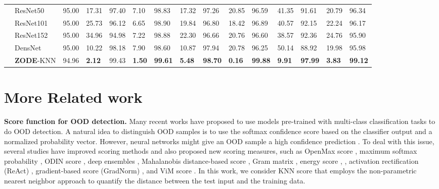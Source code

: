 \documentclass{article} \usepackage{iclr2023_conference,times}
\begin{document}
\begin{table}[t]
\begin{center}
{\begin{tabular}{lllllllllllllll}
& ResNet50 & 95.00 &  17.31 & 97.40 & 7.10 & 98.83 & 17.32 & 97.26 & 20.85 & 96.59 & 41.35 & 91.61 & 20.79 & 96.34\\
& ResNet101 & 95.00 & 25.73 & 96.12 & 6.65 & 98.90 & 19.84 & 96.80 & 18.42 & 96.89 &  40.57 & 92.15 & 22.24 & 96.17\\
& ResNet152 & 95.00 & 34.96 & 94.98 & 7.22 & 98.88 & 22.30 & 96.66 & 20.76 & 96.60 & 38.57 & 92.36 & 24.76 & 95.90 \\
& DensNet & 95.00 & 10.22 & 98.18 & 7.90 & 98.60 & 10.87 & 97.94 &  20.78 & 96.25 & 50.14 & 88.92 & 19.98 & 95.98\\
& {\bf ZODE}-KNN & 94.96 & {\bf 2.12} &  99.43 & {\bf 1.50} & {\bf 99.61} & {\bf 5.48} & {\bf 98.70} & {\bf 0.16} & {\bf 99.88} & {\bf 9.91} & {\bf 97.99} & {\bf 3.83} & {\bf 99.12} \\
\hline\hline
\end{tabular}}
\end{center}
\end{table}






\section{More Related work}\label{Related work}

\textbf{Score function for OOD detection.} Many recent works have proposed to use models pre-trained with multi-class classification tasks to do OOD detection.
A natural idea to distinguish OOD samples is to use the softmax confidence score based on the classifier output and a normalized probability vector.
However, neural networks might give an OOD sample a high confidence prediction \citep{guo2017calibration,hein2019relu}.
To deal with this issue, several studies have improved scoring methods and also proposed new scoring measures, such as OpenMax score \citep{bendale2015towards}, maximum softmax probability \citep{hendrycks17baseline}, ODIN score \citep{liang2018enhancing}, deep ensembles \citep{lakshminarayanan2017simple}, Mahalanobis distance-based score \citep{lee2018simple}, Gram matrix \citep{sastry2019zero}, energy score \citep{liu2020energy}, \citep{lin2021mood}, activation rectification (ReAct) \citep{sun2021react}, gradient-based score (GradNorm) \citep{huang2021importance}, and ViM score \citep{wang2022vim}.
In this work, we consider KNN score \cite{sun2022knn} that employs the non-parametric nearest neighbor approach to quantify the distance between the test input and the training data.    
 
\end{document}
